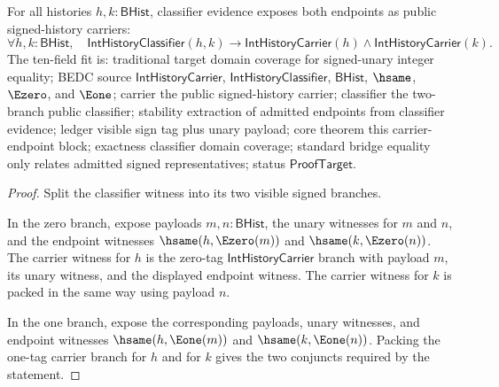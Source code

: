 \begin{theorem}
\label{thm:int-history-classifier-carrier-endpoints}
For all histories $h,k:\mathsf{BHist}$, classifier evidence exposes both
endpoints as public signed-history carriers:
$$
\forall h,k:\mathsf{BHist},\quad
\mathsf{IntHistoryClassifier}(h,k)\to
\mathsf{IntHistoryCarrier}(h)\land\mathsf{IntHistoryCarrier}(k).
$$
The ten-field fit is: traditional target domain coverage for signed-unary
integer equality; BEDC source $\mathsf{IntHistoryCarrier}$,
$\mathsf{IntHistoryClassifier}$, $\mathsf{BHist}$, $\hsame$, $\Ezero$, and
$\Eone$; carrier the public signed-history carrier; classifier the two-branch
public classifier; stability extraction of admitted endpoints from classifier
evidence; ledger visible sign tag plus unary payload; core theorem this
carrier-endpoint block; exactness classifier domain coverage; standard bridge
equality only relates admitted signed representatives; status
$\mathsf{ProofTarget}$.
\end{theorem}
\begin{proof}
Split the classifier witness into its two visible signed branches.

In the zero branch, expose payloads $m,n:\mathsf{BHist}$, the unary witnesses
for $m$ and $n$, and the endpoint witnesses $\hsame(h,\Ezero(m))$ and
$\hsame(k,\Ezero(n))$. The carrier witness for $h$ is the zero-tag
$\mathsf{IntHistoryCarrier}$ branch with payload $m$, its unary witness, and
the displayed endpoint witness. The carrier witness for $k$ is packed in the
same way using payload $n$.

In the one branch, expose the corresponding payloads, unary witnesses, and
endpoint witnesses $\hsame(h,\Eone(m))$ and $\hsame(k,\Eone(n))$. Packing the
one-tag carrier branch for $h$ and for $k$ gives the two conjuncts required by
the statement.
\end{proof}

